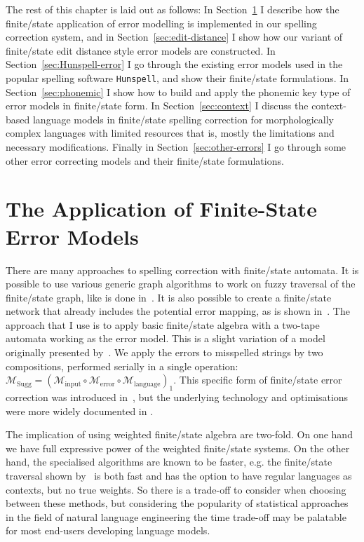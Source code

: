 \documentclass[officiallayout]{unihelcompling}
\begin{document}
The rest of this chapter is laid out as follows: In
Section~\ref{sec:error-application} I describe how the finite\-/state
application of error modelling is implemented in our spelling correction system,
and in Section~\ref{sec:edit-distance} I show how our variant of finite\-/state
edit distance style error models are constructed.  In
Section~\ref{sec:Hunspell-error} I go through the existing error models used in
the popular spelling software \texttt{Hunspell}, and show their finite\-/state
formulations. In Section~\ref{sec:phonemic} I show how to build and apply the
phonemic key type of error models in finite\-/state form.  In
Section~\ref{sec:context} I discuss the context-based language models in
finite\-/state spelling correction for morphologically complex languages with
limited resources that is, mostly the limitations and necessary modifications.
Finally in Section~\ref{sec:other-errors} I go through some other error
correcting models and their finite\-/state formulations.

\section{The Application of Finite-State Error Models}
\label{sec:error-application}

There are many approaches to spelling correction with finite\-/state automata.
It is possible to use various generic graph algorithms to work on fuzzy
traversal of the finite\-/state graph, like is done in~\citet{hulden2009fast}.
It is also possible to create a finite\-/state network that already includes
the potential error mapping, as is shown in~\citet{schulz2002fast}. The
approach that I use is to apply basic finite\-/state algebra with a two-tape
automata working as the error model. This is a slight variation of a model
originally presented by~\citet{mohri2003edit}. We apply the errors to
misspelled strings by two compositions, performed serially in a single
operation: $\mathcal{M}_{\mathrm{Sugg}} = (\mathcal{M}_{\mathrm{input}} \circ
\mathcal{M}_{\mathrm{error}} \circ \mathcal{M}_{\mathrm{language}})_1$.  This
specific form of finite\-/state error correction was introduced
in~, but the underlying technology and
optimisations were more widely documented in \citet{linden2011hfst}.

The implication of using weighted finite\-/state algebra are two-fold. On one
hand we have full expressive power of the weighted finite\-/state
systems.  On the other hand, the specialised algorithms are known to be faster,
e.g.  the finite\-/state traversal shown by~\citet{hulden2009fast} is both fast
and has the option to have regular languages as contexts, but no true weights.
So there is a trade-off to consider when choosing between these methods, but
considering the popularity of statistical approaches in the field of natural
language engineering the time trade-off may be palatable for most end-users
developing language models.
\end{document}
